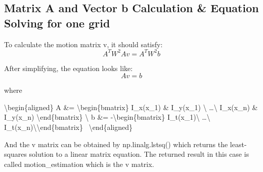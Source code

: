 \documentclass[11pt]{article}
\begin{document}
    \hypertarget{matrix-a-and-vector-b-calculation-equation-solving-for-one-grid}{%
\subsection{Matrix A and Vector b Calculation \& Equation Solving for
one
grid}\label{matrix-a-and-vector-b-calculation-equation-solving-for-one-grid}}

    To calculate the motion matrix v, it should satisfy:
\[ A^T W^2 A v = A^T W^2 b \]

After simplifying, the equation looks like: \[ A v = b \]

where

\textbackslash{}begin\{aligned\} A \&= \textbackslash{}begin\{bmatrix\}
I\_x(x\_1) \& I\_y(x\_1) \textbackslash{} \dots \textbackslash{}
I\_x(x\_n) \& I\_y(x\_n) \textbackslash{}end\{bmatrix\} \textbackslash{}
b \&= -\textbackslash{}begin\{bmatrix\} I\_t(x\_1)\textbackslash{}
\dots\textbackslash{}
I\_t(x\_n)\textbackslash{}\textbackslash{}end\{bmatrix\}~
\textbackslash{}end\{aligned\}

And the v matrix can be obtained by np.linalg.lstsq() which returns the
least-squares solution to a linear matrix equation. The returned result
in this case is called motion\_estimation which is the v matrix.
\end{document}

